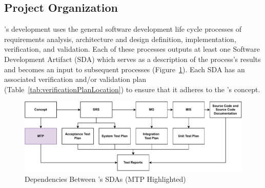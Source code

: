\subsection{Project Organization}
\progname{}'s development uses the general software development life cycle
processes of requirements analysis, architecture and design definition,
implementation, verification, and validation. Each of these processes outputs at
least one Software Development Artifact (SDA) which serves as a description of
the process's results and becomes an input to subsequent processes
(Figure~\ref{fig:dependencies}). Each SDA has an associated verification and/or
validation plan (Table~\ref{tab:verificationPlanLocation}) to ensure that it
adheres to the \progname{}'s concept.

\vspace*{\fill}
\begin{figure}[!h]
    \centering
    \includegraphics[width=\textwidth]{figures/mtpOrg.pdf}
    \caption{Dependencies Between \progname{}'s SDAs (MTP Highlighted)}
    \label{fig:dependencies}
\end{figure}

